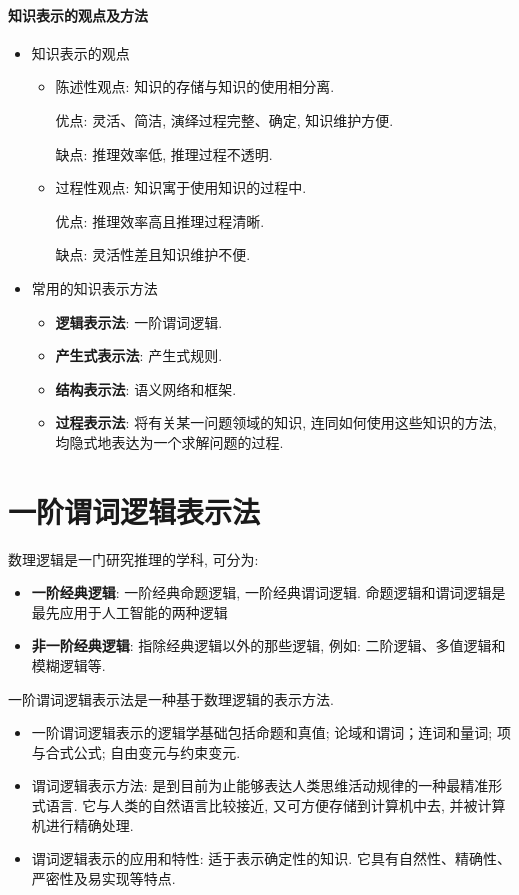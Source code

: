 \paragraph{知识表示的观点及方法}
\begin{itemize}
  \item 知识表示的观点
  \begin{itemize}
\item 陈述性观点: 知识的存储与知识的使用相分离.

           优点: 灵活、简洁, 演绎过程完整、确定, 知识维护方便.

           缺点: 推理效率低, 推理过程不透明.
\item 过程性观点: 知识寓于使用知识的过程中.

           优点: 推理效率高且推理过程清晰.

           缺点: 灵活性差且知识维护不便.
     \end{itemize}
\item 常用的知识表示方法
      \begin{itemize}
        \item \textbf{逻辑表示法}: 一阶谓词逻辑.
        \item \textbf{产生式表示法}: 产生式规则.
        \item \textbf{结构表示法}: 语义网络和框架.
        \item \textbf{过程表示法}: 将有关某一问题领域的知识, 连同如何使用这些知识的方法, 均隐式地表达为一个求解问题的过程.
      \end{itemize}
\end{itemize}
\section{一阶谓词逻辑表示法}
数理逻辑是一门研究推理的学科, 可分为:
\begin{itemize}
    \item \textbf{一阶经典逻辑}: 一阶经典命题逻辑, 一阶经典谓词逻辑. 命题逻辑和谓词逻辑是最先应用于人工智能的两种逻辑
    \item \textbf{非一阶经典逻辑}: 指除经典逻辑以外的那些逻辑, 例如: 二阶逻辑、多值逻辑和模糊逻辑等.
\end{itemize}

一阶谓词逻辑表示法是一种基于数理逻辑的表示方法.
\begin{itemize}
    \item 一阶谓词逻辑表示的逻辑学基础包括命题和真值; 论域和谓词；连词和量词; 项与合式公式; 自由变元与约束变元.
    \item 谓词逻辑表示方法: 是到目前为止能够表达人类思维活动规律的一种最精准形式语言. 它与人类的自然语言比较接近, 又可方便存储到计算机中去, 并被计算机进行精确处理.
    \item 谓词逻辑表示的应用和特性: 适于表示确定性的知识. 它具有自然性、精确性、严密性及易实现等特点.
\end{itemize}
